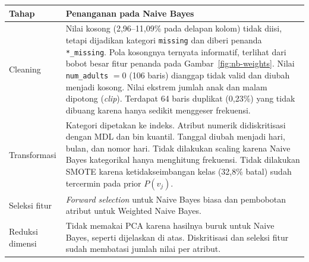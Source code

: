 \begingroup
\renewcommand{\arraystretch}{1.3}
\noindent\begin{tabularx}{\textwidth}{@{}lX@{}}
  \toprule
  \textbf{Tahap} & \textbf{Penanganan pada Naive Bayes} \\
  \midrule
  Cleaning &
  Nilai kosong (2,96--11,09\% pada delapan kolom) tidak diisi, tetapi dijadikan
  kategori \texttt{missing} dan diberi penanda \texttt{*\_missing}. Pola kosongnya
  ternyata informatif, terlihat dari bobot besar fitur penanda pada
  Gambar~\ref{fig:nb-weights}. Nilai \texttt{num\_adults} $=0$ (106 baris) dianggap
  tidak valid dan diubah menjadi kosong. Nilai ekstrem jumlah anak dan malam
  dipotong (\textit{clip}). Terdapat 64 baris duplikat (0,23\%) yang tidak dibuang
  karena hanya sedikit menggeser frekuensi. \\
  Transformasi &
  Kategori dipetakan ke indeks. Atribut numerik didiskritisasi dengan MDL dan bin
  kuantil. Tanggal diubah menjadi hari, bulan, dan nomor hari. Tidak dilakukan
  scaling karena Naive Bayes kategorikal hanya menghitung frekuensi. Tidak dilakukan
  SMOTE karena ketidakseimbangan kelas (32,8\% batal) sudah tercermin pada prior
  $P(v_j)$. \\
  Seleksi fitur &
  \textit{Forward selection} untuk Naive Bayes biasa dan pembobotan atribut untuk
  Weighted Naive Bayes. \\
  Reduksi dimensi &
  Tidak memakai PCA karena hasilnya buruk untuk Naive Bayes, seperti dijelaskan di
  atas. Diskritisasi dan seleksi fitur sudah membatasi jumlah nilai per atribut. \\
  \bottomrule
\end{tabularx}
\endgroup

